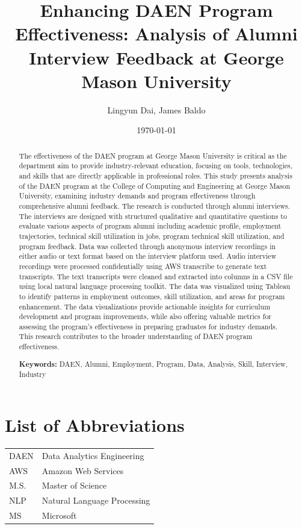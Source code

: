 \documentclass[12pt,a4paper]{article}
\title{\textbf{Enhancing DAEN Program Effectiveness: Analysis of Alumni Interview Feedback at George Mason University}}
\author{Lingyun Dai, James Baldo}
\date{\today}
\begin{document}
\maketitle

\begin{abstract}
The effectiveness of the DAEN program at George 
Mason University is critical as the department aim to provide industry-relevant education, focusing on tools, technologies, and skills that are directly applicable in professional roles. This study presents analysis of the DAEN program at the College of Computing and Engineering at George Mason University, examining industry demands and program effectiveness through comprehensive alumni feedback. The research is conducted through alumni interviews. The interviews are designed with structured qualitative and quantitative questions to evaluate various aspects of program alumni including academic profile, employment trajectories, technical skill utilization in jobs, program technical skill utilization, and program feedback. Data was collected through anonymous interview recordings in either audio or text format based on the interview platform used. Audio interview recordings were processed confidentially using AWS transcribe to generate text transcripts. The text transcripts were cleaned and extracted into columns in a CSV file using local natural language processing toolkit. The data was visualized using Tableau to identify patterns in employment outcomes, 
skill utilization, and areas for program enhancement. The data visualizations provide actionable insights for curriculum development 
and program improvements, while also offering valuable metrics for 
assessing the program's effectiveness in preparing graduates for 
industry demands. This research contributes to the broader 
understanding of DAEN program effectiveness.

\textbf{Keywords:} DAEN, Alumni, Employment, Program, Data,
 Analysis, Skill, Interview, Industry
\end{abstract}

\newpage
\tableofcontents
\newpage

\section*{List of Abbreviations}
\begin{tabular}{ll}
DAEN & Data Analytics Engineering\\
AWS & Amazon Web Services\\
M.S. & Master of Science\\
NLP & Natural Language Processing\\
MS & Microsoft\\
\end{tabular}
\newpage
\end{document}
